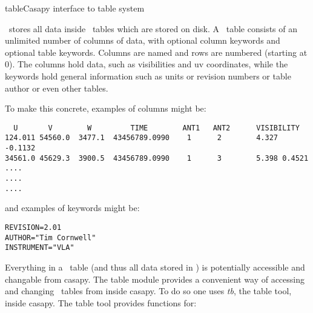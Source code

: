 \begin{ahmodule}{table}{Casapy interface to table system}


\begin{ahdescription}

\casa\ stores all data inside \casa\ tables which 
are stored on disk.
A \casa\ table consists of an unlimited number of columns of data,
with optional column keywords and optional table keywords. Columns are
named and rows are numbered (starting at 0).  The columns hold data,
such as visibilities and uv coordinates, while the keywords hold
general information such as units or revision numbers or table author
or even other tables.

To make this concrete, examples of columns might be:

\begin{verbatim}
  U       V        W         TIME        ANT1   ANT2      VISIBILITY
124.011 54560.0  3477.1  43456789.0990    1      2        4.327 -0.1132
34561.0 45629.3  3900.5  43456789.0990    1      3        5.398 0.4521
....
....
....
\end{verbatim}

and examples of keywords might be:

\begin{verbatim}
REVISION=2.01
AUTHOR="Tim Cornwell"
INSTRUMENT="VLA"
\end{verbatim}

Everything in a \casa\ table (and thus all data stored in \casa) is
potentially accessible and changable from casapy. The table module
provides a convenient way of accessing and changing \casa\ tables from
inside casapy. To do so one uses {\sl tb}, the table tool, inside
casapy. The table tool provides functions for:


\end{ahdescription}
\end{ahmodule}
